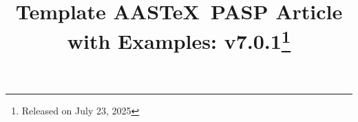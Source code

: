 \documentclass[linenumbers,trackchanges]{aastex701}
\newcommand\aastex{AAS\TeX}
\begin{document}
\title{Template \aastex\ PASP Article with Examples: 
v7.0.1\footnote{Released on July 23, 2025}}

\end{document}
